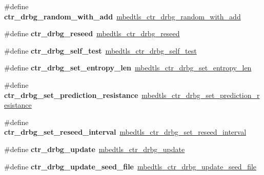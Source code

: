 \begin{DoxyCompactItemize}
\#define {\bfseries ctr\+\_\+drbg\+\_\+random\+\_\+with\+\_\+add}~\mbox{\hyperlink{ctr__drbg_8h_a18161010cbcf33f6930fa8fdc035e74d}{mbedtls\+\_\+ctr\+\_\+drbg\+\_\+random\+\_\+with\+\_\+add}}
\item 
\mbox{\label{compat-1_83_8h_a6b5ceba46a5a41b7eb0b004c70d86637}} 
\#define {\bfseries ctr\+\_\+drbg\+\_\+reseed}~\mbox{\hyperlink{ctr__drbg_8h_a495e3c86df7fc166454d0e85262e40a6}{mbedtls\+\_\+ctr\+\_\+drbg\+\_\+reseed}}
\item 
\mbox{\label{compat-1_83_8h_a8793d72af9843c90402548be972359d3}} 
\#define {\bfseries ctr\+\_\+drbg\+\_\+self\+\_\+test}~\mbox{\hyperlink{ctr__drbg_8h_a6f4c2d5ae50d4f122a6a1468480a9c3e}{mbedtls\+\_\+ctr\+\_\+drbg\+\_\+self\+\_\+test}}
\item 
\mbox{\label{compat-1_83_8h_a1523d9cd0f3cc2410256d2bf1650b45e}} 
\#define {\bfseries ctr\+\_\+drbg\+\_\+set\+\_\+entropy\+\_\+len}~\mbox{\hyperlink{ctr__drbg_8h_af33ced4a1fc79c6abbc1cb2b17f14549}{mbedtls\+\_\+ctr\+\_\+drbg\+\_\+set\+\_\+entropy\+\_\+len}}
\item 
\mbox{\label{compat-1_83_8h_a4607646f416f44654c0556013064c5d3}} 
\#define {\bfseries ctr\+\_\+drbg\+\_\+set\+\_\+prediction\+\_\+resistance}~\mbox{\hyperlink{ctr__drbg_8h_ae9871c5ba6b2fa5189423ef7cbe2078b}{mbedtls\+\_\+ctr\+\_\+drbg\+\_\+set\+\_\+prediction\+\_\+resistance}}
\item 
\mbox{\label{compat-1_83_8h_af494c21e52aee7b5dcc74051d5e26a17}} 
\#define {\bfseries ctr\+\_\+drbg\+\_\+set\+\_\+reseed\+\_\+interval}~\mbox{\hyperlink{ctr__drbg_8h_aefd5f442f96682f0cef0152866e4e46e}{mbedtls\+\_\+ctr\+\_\+drbg\+\_\+set\+\_\+reseed\+\_\+interval}}
\item 
\mbox{\label{compat-1_83_8h_aee691ec930b852b4214569c426ddb9c4}} 
\#define {\bfseries ctr\+\_\+drbg\+\_\+update}~\mbox{\hyperlink{ctr__drbg_8h_a79d4bdb84d0c13f4bb28d5c3c6de4011}{mbedtls\+\_\+ctr\+\_\+drbg\+\_\+update}}
\item 
\mbox{\label{compat-1_83_8h_a862e00c69776e0e0a4a010a1f5617250}} 
\#define {\bfseries ctr\+\_\+drbg\+\_\+update\+\_\+seed\+\_\+file}~\mbox{\hyperlink{ctr__drbg_8h_a2dd8fb85c308475ca743aa634d4b0b96}{mbedtls\+\_\+ctr\+\_\+drbg\+\_\+update\+\_\+seed\+\_\+file}}

\end{DoxyCompactItemize}
